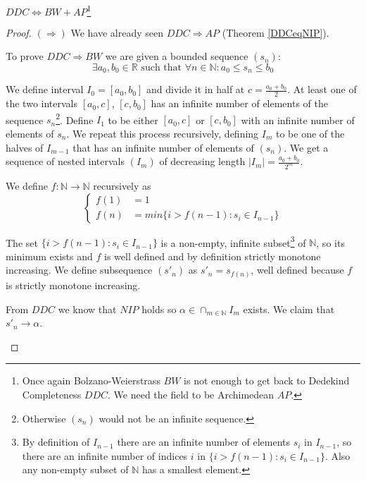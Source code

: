 \begin{thm}\label{DDCeqBW}
$DDC \Leftrightarrow BW + AP$\footnote{Once again Bolzano-Weierstrass $BW$ is not enough to get back to Dedekind Completeness $DDC$. We need the field to be Archimedean $AP$.}
\end{thm}

\begin{proof}
\noindent$(\Rightarrow)$ We have already seen $DDC \Rightarrow AP$ (Theorem \ref{DDCeqNIP}).

\begin{proofpart}\label{bwSetup}
 To prove $DDC \Rightarrow BW$ we are given a bounded sequence $(s_n)$:
\[
\exists a_0, b_0 \in \mathbb{R} \text{ such that } \forall n \in \mathbb{N}: a_0 \leq s_n \leq b_0 
\]

We define interval $I_0 = [a_0, b_0]$ and divide it in half at $c = \frac{a_0 + b_0}{2}$. At least one of the two intervals $[a_0, c]$, $[c, b_0]$ has an infinite number of elements of the sequence $s_n$\footnote{Otherwise $(s_n)$ would not be an infinite sequence.}. Define $I_1$ to be either $[a_0, c]$ or $[c, b_0]$ with an infinite number of elements of $s_n$. We repeat this process recursively, defining $I_m$ to be one of the halves of $I_{m - 1}$ that has an infinite number of elements of $(s_n)$. We get a sequence of nested intervals $(I_m)$ of decreasing length $|I_m| = \frac{a_0 + b_0}{2^m}$.

We define $f:\mathbb{N} \to \mathbb{N}$ recursively as
\[
\begin{cases}
f(1)&= 1\\
f(n)&= min\{i > f(n-1): s_i \in I_{n-1}\}	
\end{cases}
\]

The set $\{i > f(n-1): s_i \in I_{n-1}\}$ is a non-empty, infinite subset\footnote{By definition of $I_{n-1}$ there are an infinite number of elements $s_i$ in $I_{n-1}$, so there are an infinite number of indices $i$ in $\{i > f(n-1): s_i \in I_{n-1}\}$. Also any non-empty subset of $\mathbb{N}$ has a smallest element.} of $\mathbb{N}$, so its minimum exists and $f$ is well defined and by definition strictly monotone increasing. We define subsequence $(s'_n)$ as $s'_n = s_{f(n)}$, well defined because $f$ is strictly monotone increasing.

\end{proofpart}

\begin{proofpart}
From $DDC$ we know that $NIP$ holds so $\alpha \in \cap_{m \in \mathbb{N}} I_m$ exists. We claim that $s'_n \to \alpha$.


\end{proofpart}
\end{proof}
